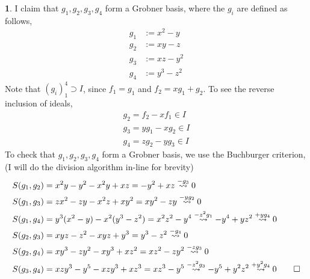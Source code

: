 \documentclass[11pt]{article}
\theoremstyle{definition}
\newtheorem{pb}{}
\begin{document}
    \begin{pb}
        I claim that \(g_1,g_2,g_3,g_4\) form a Grobner basis, where the \(g_i\) are defined as follows,
        \begin{align*}
            g_1 &:= x^2 - y \\
            g_2 &:= xy - z \\
            g_3 &:= xz - y^2 \\
            g_4 &:= y^3 - z^2 
        \end{align*}
        Note that \((g_i)_1^4 \supset I\), since \(f_1 = g_1\) and \(f_2 = xg_1 + g_2\). To see the reverse inclusion of ideals,
        \begin{align*}
            g_2 = f_2 - xf_1 \in I \\
            g_3 = yg_1 - xg_2 \in I \\
            g_4 = zg_2 - yg_3 \in I
        \end{align*}
        To check that \(g_1,g_2,g_3,g_4\) form a Grobner basis, we use the Buchburger criterion, (I will do the division algorithm in-line for brevity)
        \begin{align*}
            S(g_1,g_2) &= x^2y-y^2-x^2y+xz = -y^2 + xz \overset{-g_3}{\rightsquigarrow} 0 \\
            S(g_1,g_3) &= zx^2 - zy -x^2z + xy^2 = xy^2 - zy \overset{-yg_2}{\rightsquigarrow} 0 \\
            S(g_1,g_4) &= y^3(x^2 - y) - x^2(y^3 - z^2) = x^2z^2 - y^4 \overset{-z^2g_1}{\rightsquigarrow} -y^4 + yz^2 \overset{+yg_4}{\rightsquigarrow} 0 \\
            S(g_2,g_3) &= xyz - z^2 - xyz + y^3 = y^3 - z^2 \overset{-g_4}{\rightsquigarrow} 0 \\
            S(g_2,g_4) &= xy^3 - zy^2 - xy^3 + xz^2 = xz^2 - zy^2 \overset{-zg_3}{\rightsquigarrow} 0 \\
            S(g_3,g_4) &= xzy^3 - y^5 - xzy^3 + xz^3 = xz^3 - y^5 \overset{-z^2g_3}{\rightsquigarrow} -y^5 + y^2z^2 \overset{+y^2g_4}{\rightsquigarrow} 0 \qed
        \end{align*}
    \end{pb}
\end{document}
